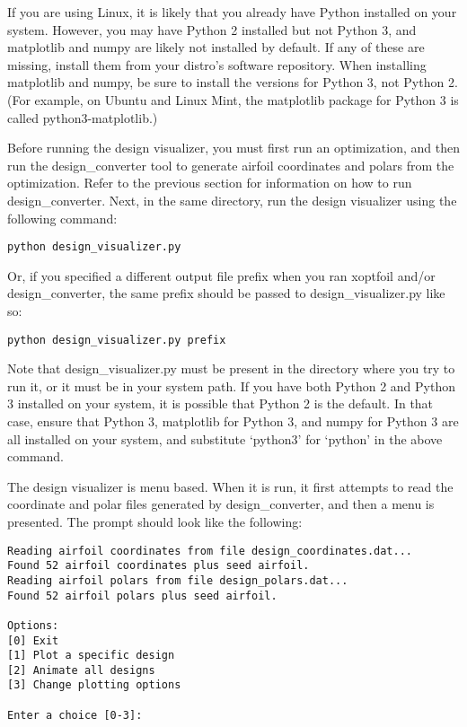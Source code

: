 \documentclass[11pt]{article}
\begin{document}
If you are using Linux, it is likely that you already have Python installed on your
system.  However, you may have Python 2 installed but not Python 3, and matplotlib and
numpy are likely not installed by default.  If any of these are missing, install them from
your distro's software repository.  When installing matplotlib and numpy, be sure to
install the versions for Python 3, not Python 2.  (For example, on Ubuntu and Linux Mint,
the matplotlib package for Python 3 is called python3-matplotlib.)

Before running the design visualizer, you must first run an optimization, and then run the
design\_converter tool to generate airfoil coordinates and polars from the optimization.
Refer to the previous section for information on how to run design\_converter.  Next, in
the same directory, run the design visualizer using the following command:

\begin{verbatim}
python design_visualizer.py
\end{verbatim}

\noindent Or, if you specified a different output file prefix when you ran xoptfoil and/or
design\_converter, the same prefix should be passed to design\_visualizer.py like so:

\begin{verbatim}
python design_visualizer.py prefix
\end{verbatim}

Note that design\_visualizer.py must be present in the directory where you try to run it,
or it must be in your system path.  If you have both Python 2 and Python 3 installed on
your system, it is possible that Python 2 is the default.  In that case, ensure that
Python 3, matplotlib for Python 3, and numpy for Python 3 are all installed on your
system, and substitute `python3' for `python' in the above command.  

The design visualizer is menu based.  When it is run, it first attempts to read the
coordinate and polar files generated by design\_converter, and then a menu is presented.
The prompt should look like the following:

\begin{verbatim}
Reading airfoil coordinates from file design_coordinates.dat...
Found 52 airfoil coordinates plus seed airfoil.
Reading airfoil polars from file design_polars.dat...
Found 52 airfoil polars plus seed airfoil.

Options:
[0] Exit
[1] Plot a specific design
[2] Animate all designs
[3] Change plotting options

Enter a choice [0-3]: 
\end{verbatim}
\end{document}
